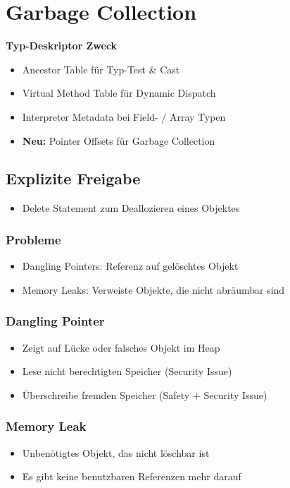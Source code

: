 \section{Garbage Collection}
\textbf{Typ-Deskriptor Zweck}
\begin{itemize}
    \item Ancestor Table für Typ-Test \& Cast
    \item Virtual Method Table für Dynamic Dispatch
    \item Interpreter Metadata bei Field- / Array Typen
    \item \textbf{Neu:} Pointer Offsets für Garbage Collection
\end{itemize}

\subsection{Explizite Freigabe}
\begin{itemize}
    \item Delete Statement zum Deallozieren eines Objektes
\end{itemize}
\subsubsection{Probleme}
\begin{itemize}
    \item Dangling Pointers: Referenz auf gelöschtes Objekt
    \item Memory Leaks: Verweiste Objekte, die nicht abräumbar sind
\end{itemize}

\subsubsection{Dangling Pointer}
\begin{itemize}
    \item Zeigt auf Lücke oder falsches Objekt im Heap
    \item Lese nicht berechtigten Speicher (Security Issue)
    \item Überschreibe fremden Speicher (Safety + Security Issue)
\end{itemize}

\subsubsection{Memory Leak}
\begin{itemize}
    \item Unbenötigtes Objekt, das nicht löschbar ist
    \item Es gibt keine benutzbaren Referenzen mehr darauf
\end{itemize}

